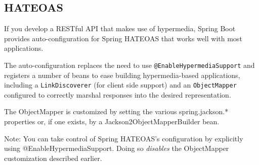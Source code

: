 \documentclass{scrartcl}
\begin{document}
\subsection{HATEOAS}

If you develop a RESTful API that makes use of hypermedia, Spring Boot provides auto-configuration for Spring HATEOAS that works well with most applications.

The auto-configuration replaces the need to use \lstinline|@EnableHypermediaSupport| and registers a number of beans to ease building hypermedia-based applications, including a \lstinline|LinkDiscoverer| (for client side support) and an \lstinline|ObjectMapper| configured to correctly marshal responses into the desired representation.

The ObjectMapper is customized by setting the various spring.jackson.* properties or, if one exists, by a Jackson2ObjectMapperBuilder bean.

Note: You can take control of Spring HATEOAS’s configuration by explicitly using @EnableHypermediaSupport. Doing so \textit{disables} the ObjectMapper customization described earlier.
\end{document}
